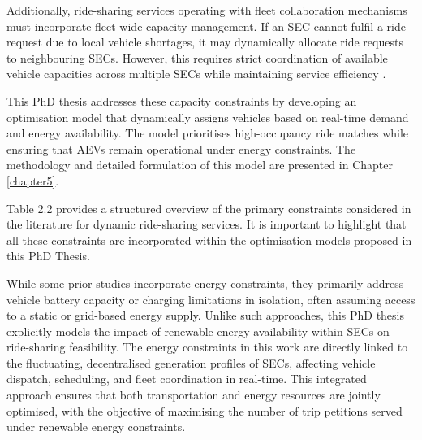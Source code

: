 Additionally, ride-sharing services operating with fleet collaboration mechanisms must incorporate fleet-wide capacity management. If an SEC cannot fulfil a ride request due to local vehicle shortages, it may dynamically allocate ride requests to neighbouring SECs. However, this requires strict coordination of available vehicle capacities across multiple SECs while maintaining service efficiency \cite{yang2021dynamic}.

This PhD thesis addresses these capacity constraints by developing an optimisation model that dynamically assigns vehicles based on real-time demand and energy availability. The model prioritises high-occupancy ride matches while ensuring that AEVs remain operational under energy constraints. The methodology and detailed formulation of this model are presented in Chapter \ref{chapter5}.

Table 2.2 provides a structured overview of the primary constraints considered in the literature for dynamic ride-sharing services. It is important to highlight that all these constraints are incorporated within the optimisation models proposed in this PhD Thesis.

While some prior studies incorporate energy constraints, they primarily address vehicle battery capacity or charging limitations in isolation, often assuming access to a static or grid-based energy supply. Unlike such approaches, this PhD thesis explicitly models the impact of renewable energy availability within SECs on ride-sharing feasibility. The energy constraints in this work are directly linked to the fluctuating, decentralised generation profiles of SECs, affecting vehicle dispatch, scheduling, and fleet coordination in real-time. This integrated approach ensures that both transportation and energy resources are jointly optimised, with the objective of maximising the number of trip petitions served under renewable energy constraints.



